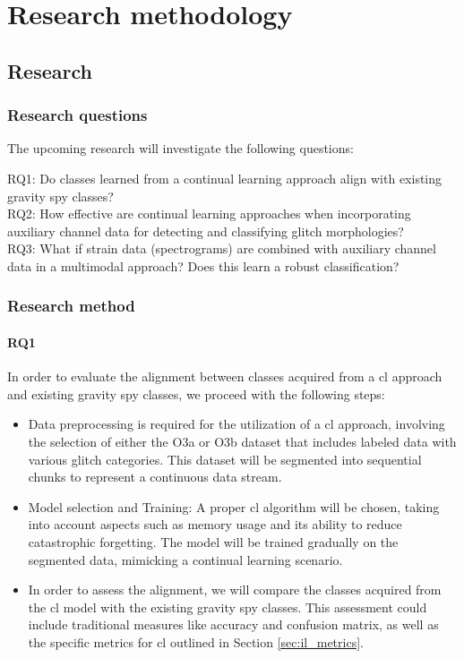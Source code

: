 \chapter{Research methodology}
\label{ch-3}
\section{Research}
\label{sec-Research}
\subsection{Research questions}
The upcoming research will investigate the following questions:  

\begin{mdframed}[backgroundcolor=lightgray!20]
\par RQ1: Do classes learned from a continual learning approach align with existing gravity spy classes?\\
RQ2: How effective are continual learning approaches when incorporating auxiliary channel data for detecting and classifying glitch morphologies?\\
RQ3: What if strain data (spectrograms) are combined with auxiliary channel data in a multimodal approach? Does this learn a robust classification?
\end{mdframed}

\subsection{Research method}
\label{subsec-researchmethod}
\subsubsection{RQ1}
In order to evaluate the alignment between classes acquired from a \acrlong{cl} approach and existing gravity spy classes, we proceed with the following steps:
\begin{itemize}
    \item Data preprocessing is required for the utilization of a \acrshort{cl} approach, involving the selection of either the O3a or O3b dataset that includes labeled data with various glitch categories. This dataset will be segmented into sequential chunks to represent a continuous data stream.
    \item Model selection and Training: A proper \acrshort{cl} algorithm will be chosen, taking into account aspects such as memory usage and its ability to reduce catastrophic forgetting. The model will be trained gradually on the segmented data, mimicking a continual learning scenario.
    \item In order to assess the alignment, we will compare the classes acquired from the \acrshort{cl} model with the existing gravity spy classes. This assessment could include traditional measures like accuracy and confusion matrix, as well as the specific metrics for \acrshort{cl} outlined in Section \ref{sec:il_metrics}. 
\end{itemize}
